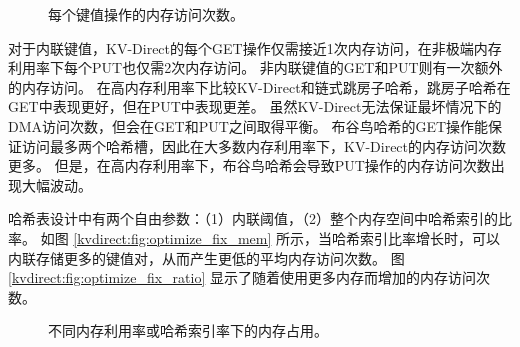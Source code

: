 \begin{figure}[htbp]
	\centering
	
	\vfill
	
	\caption{每个键值操作的内存访问次数。}
	\label{kvdirect:fig:mem-access-tput}
\end{figure}


对于内联键值，KV-Direct的每个GET操作仅需接近1次内存访问，在非极端内存利用率下每个PUT也仅需2次内存访问。
非内联键值的GET和PUT则有一次额外的内存访问。
在高内存利用率下比较KV-Direct和链式跳房子哈希，跳房子哈希在GET中表现更好，但在PUT中表现更差。
虽然KV-Direct无法保证最坏情况下的DMA访问次数，但会在GET和PUT之间取得平衡。
布谷鸟哈希的GET操作能保证访问最多两个哈希槽，因此在大多数内存利用率下，KV-Direct的内存访问次数更多。
但是，在高内存利用率下，布谷鸟哈希会导致PUT操作的内存访问次数出现大幅波动。



\label{kvdirect:sec:hashtable-eval}

哈希表设计中有两个自由参数：（1）内联阈值，（2）整个内存空间中哈希索引的比率。
如图 \ref {kvdirect:fig:optimize_fix_mem} 所示，当哈希索引比率增长时，可以内联存储更多的键值对，从而产生更低的平均内存访问次数。
图 \ref {kvdirect:fig:optimize_fix_ratio} 显示了随着使用更多内存而增加的内存访问次数。


\begin{figure}[htbp]
	\caption{不同内存利用率或哈希索引率下的内存占用。}
	\label{kvdirect:fig:memory-access-count}
\end{figure}

